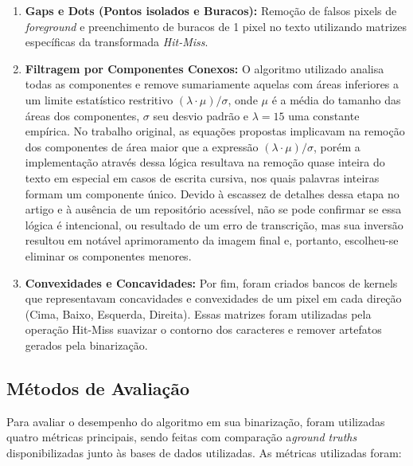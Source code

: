 \documentclass[conference]{IEEEtran}
\begin{document}
\begin{enumerate}
    \item \textbf{Gaps e Dots (Pontos isolados e Buracos):} Remoção de falsos pixels de \textit{foreground} e preenchimento de buracos de 1 pixel no texto utilizando matrizes específicas da transformada \textit{Hit-Miss}.
    \item \textbf{Filtragem por Componentes Conexos:} O algoritmo utilizado analisa todas as componentes e remove sumariamente aquelas com áreas inferiores a um limite estatístico restritivo $(\lambda \cdot \mu) / \sigma$, onde $\mu$ é a média do tamanho das áreas dos componentes, $\sigma$ seu desvio padrão e $\lambda = 15$ uma constante empírica. No trabalho original, as equações propostas implicavam na remoção dos componentes de área maior que a expressão $(\lambda \cdot \mu) / \sigma$, porém a implementação através dessa lógica resultava na remoção quase inteira do texto em especial em casos de escrita cursiva, nos quais palavras inteiras formam um componente único. Devido à escassez de detalhes dessa etapa no artigo e à ausência de um repositório acessível, não se pode confirmar se essa lógica é intencional, ou resultado de um erro de transcrição, mas sua inversão resultou em notável aprimoramento da imagem final e, portanto, escolheu-se eliminar os componentes menores.
    
    \item \textbf{Convexidades e Concavidades:} Por fim, foram criados bancos de kernels que representavam concavidades e convexidades de um pixel em cada direção (Cima, Baixo, Esquerda, Direita). Essas matrizes foram utilizadas pela operação Hit-Miss suavizar o contorno dos caracteres e remover artefatos gerados pela binarização.
\end{enumerate}

\subsection{Métodos de Avaliação}

Para avaliar o desempenho do algoritmo em sua binarização, foram  utilizadas quatro métricas principais, sendo feitas com comparação a\textit{ground truths} disponibilizadas junto às bases de dados utilizadas. As métricas utilizadas foram:
\end{document}
